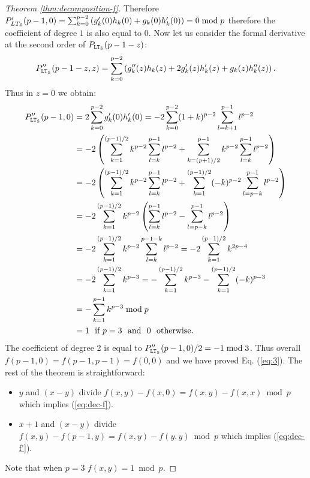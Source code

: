 \begin{proof}[Theorem \ref{thm:decomposition-f}]
Therefore $P'_{LT_\S}(p-1,0) = \sum_{k=0}^{p-2}\left(g_k'(0)h_k(0) + g_k(0)h'_k(0) \right) = 0 \bmod p$ therefore the coefficient of degree $1$ is also equal to $0$. 
Now let us consider the formal derivative at the second order of $P_{\LT_\S}(p-1-z)$:
$$P''_{\LT_\S}(p-1-z,z) = \sum_{k=0}^{p-2}\left(g_k''(z)h_k(z) + 2g_k'(z)h'_k(z) + g_k(z)h''_k(z) \right).$$
Thus in $z=0$ we obtain: 
\begin{align*}
  P''_{\LT_\S}(p-1,0) & = 2\sum_{k=0}^{p-2}g_k'(0)h'_k(0) = -2\sum_{k=0}^{p-2}(1+k)^{p-2}\sum_{l=k+1}^{p-1}l^{p-2} \\
                      &= -2\left(\sum_{k=1}^{(p-1)/2}k^{p-2}\sum_{l=k}^{p-1}l^{p-2} + \sum_{k=(p+1)/2}^{p-1}k^{p-2}\sum_{l=k}^{p-1}l^{p-2}\right) \\
                      & = -2\left(\sum_{k=1}^{(p-1)/2}k^{p-2}\sum_{l=k}^{p-1}l^{p-2} + \sum_{k=1}^{(p-1)/2}(-k)^{p-2}\sum_{l=p-k}^{p-1}l^{p-2}\right) \\
                      & = -2\sum_{k=1}^{(p-1)/2}k^{p-2}\left(\sum_{l=k}^{p-1}l^{p-2} -  \sum_{l=p-k}^{p-1}l^{p-2}\right) \\
                      & = -2\sum_{k=1}^{(p-1)/2}k^{p-2}\sum_{l=k}^{p-1-k}l^{p-2} = -2\sum_{k=1}^{(p-1)/2}k^{2p-4} \\
                      & = -2\sum_{k=1}^{(p-1)/2}k^{p-3} = -\sum_{k=1}^{(p-1)/2}k^{p-3} - \sum_{k=1}^{(p-1)/2}(-k)^{p-3} \\
                      & = -\sum_{k=1}^{p-1}k^{p-3}  \bmod p\\
                      & = 1 ~\text{ if } p = 3 ~\text{ and }~ 0 ~\text{ otherwise.}
\end{align*}
The coefficient of degree 2 is equal to $P''_{\LT_\S}(p-1,0)/2 = -1 \bmod 3$.
Thus overall $f(p-1,0) = f(p-1,p-1) = f(0,0)$ and we have proved Eq. (\ref{eq:3}). The rest of the theorem is straightforward:
\begin{itemize}
\item $y$ and $(x-y)$ divide $f(x,y)-f(x,0) = f(x,y)-f(x,x) \bmod p$ which implies (\ref{eq:dec-f}). 
\item $x+1$ and $(x-y)$ divide $f(x,y)-f(p-1,y) = f(x,y)-f(y,y) \bmod p$ which implies (\ref{eq:dec-f'}).
\end{itemize}
Note that when $p=3$ $f(x,y) = 1 \bmod p.$
\end{proof}
  
